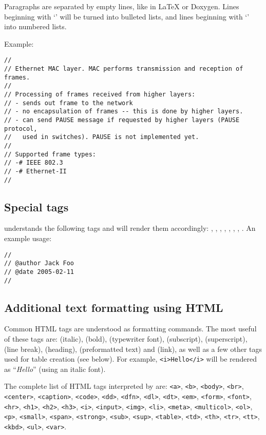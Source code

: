 Paragraphs are separated by empty lines, like in LaTeX or Doxygen.
Lines beginning with `\ttt{-}' will be turned into bulleted lists,
and lines beginning with `\ttt{-\#}' into numbered lists.

Example:

\begin{verbatim}
//
// Ethernet MAC layer. MAC performs transmission and reception of frames.
//
// Processing of frames received from higher layers:
// - sends out frame to the network
// - no encapsulation of frames -- this is done by higher layers.
// - can send PAUSE message if requested by higher layers (PAUSE protocol,
//   used in switches). PAUSE is not implemented yet.
//
// Supported frame types:
// -# IEEE 802.3
// -# Ethernet-II
//
\end{verbatim}


\subsection{Special tags}

 understands the following tags and will render them accordingly:
, , , , , ,
, . An example usage:

\begin{verbatim}
//
// @author Jack Foo
// @date 2005-02-11
//
\end{verbatim}


\subsection{Additional text formatting using HTML}

Common HTML tags are understood as formatting commands.
The most useful of these tags are:  (italic),
 (bold),  (typewriter font),
 (subscript),  (superscript),
 (line break),  (heading),
 (preformatted text) and  (link),
as well as a few other tags used for table creation (see below).
For example, \texttt{<i>Hello</i>} will be rendered as ``\textit{Hello}''
(using an italic font).

The complete list of HTML tags interpreted by  are:
\texttt{<a>}, \texttt{<b>}, \texttt{<body>}, \texttt{<br>}, \texttt{<center>},
\texttt{<caption>}, \texttt{<code>}, \texttt{<dd>}, \texttt{<dfn>}, \texttt{<dl>},
\texttt{<dt>}, \texttt{<em>}, \texttt{<form>}, \texttt{<font>}, \texttt{<hr>},
\texttt{<h1>}, \texttt{<h2>}, \texttt{<h3>}, \texttt{<i>}, \texttt{<input>}, \texttt{<img>},
\texttt{<li>}, \texttt{<meta>}, \texttt{<multicol>}, \texttt{<ol>}, \texttt{<p>}, \texttt{<small>},
\texttt{<span>}, \texttt{<strong>},
\texttt{<sub>}, \texttt{<sup>}, \texttt{<table>}, \texttt{<td>}, \texttt{<th>}, \texttt{<tr>},
\texttt{<tt>}, \texttt{<kbd>}, \texttt{<ul>}, \texttt{<var>}.

